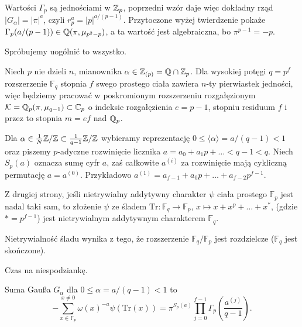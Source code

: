 Wartości $\Gamma_p$ są jednościami w $\mathbb Z_p$, poprzedni wzór daje więc dokładny rząd $|G_\alpha| = |\pi|^a$, czyli $r_p^a = |p|^{a/(p-1)}$.
Przytoczone wyżej twierdzenie pokaże $\Gamma_p(a/(p-1)) \in \mathbb Q(\pi,\mu_{p^2-p})$, a ta wartość jest algebraiczna, bo $\pi^{p-1} = -p$.

Spróbujemy uogólnić to wszystko.

Niech $p$ nie dzieli $n$, mianownika $\alpha \in \mathbb Z_{(p)} = \mathbb Q \cap \mathbb Z_p$.
Dla wysokiej potęgi $q = p^f$ rozszerzenie $\mathbb F_q$ stopnia $f$ swego prostego ciała zawiera $n$-ty pierwiastek jedności, więc będziemy pracować w poskromionym rozszerzeniu rozgałęzionym
${\mathcal K = \mathbb Q_p(\pi, \mu_{q-1}) \subset \mathbb C_p}$ o indeksie rozgałęzienia $e = p-1$, stopniu  residuum $f$ i przez to stopnia $m = ef$ nad $\mathbb Q_p$.

Dla $\alpha \in \frac{1}{N} \mathbb Z/\mathbb Z \subset \frac{1}{q-1} \mathbb Z/\mathbb Z$ wybieramy reprezentację $0 \le \langle \alpha \rangle = a/(q-1) < 1$ oraz piszemy $p$-adyczne rozwinięcie licznika $a = a_0 + a_1p + \ldots < q-1 < q$.
Niech $S_p(a)$ oznacza sumę cyfr $a$, %
zaś całkowite $a^{(i)}$ za rozwinięcie mają cykliczną permutację
$a = a^{(0)}$.
Przykładowo $a^{(1)} = a_{f-1} + a_0p + \dots + a_{f-2}p^{f-1}$.

Z drugiej strony, jeśli nietrywialny addytywny charakter $\psi$ ciała prostego $\mathbb F_p$ jest nadal taki sam, to złożenie $\psi$ ze śladem
$\textrm{Tr} \colon \mathbb F_q \to \mathbb F_p$, $x \mapsto x + x^p + \dots + x^{*}$, (gdzie $* = p^{f-1}$) jest nietrywialnym addytywnym charakterem $\mathbb F_q$.

Nietrywialność śladu wynika z tego, że rozszerzenie $\mathbb F_q / \mathbb F_p$ jest rozdzielcze ($\mathbb F_q$ jest skończone).

Czas na niespodziankę.

\begin{twierdzenie} 
	Suma Gaußa $G_\alpha$ dla $0 \le \alpha = a / (q-1) < 1$ to
	\[
		-\sum_{x \in \mathbb F_p}^{x\neq 0} \omega(x)^{-a} \psi (\textrm{Tr}(x)) = \pi^{S_p(a)} \prod_{j=0}^{f-1} \Gamma_p \left( \frac{a^{(j)}}{q-1} \right).
	\]
\end{twierdzenie}
